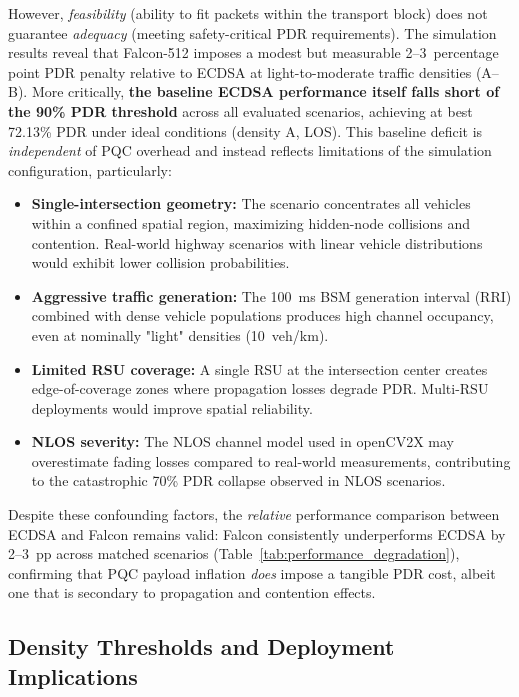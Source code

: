 \documentclass[letterpaper,journal]{IEEEtran}
\begin{document}
However, \emph{feasibility} (ability to fit packets within the transport block) does not guarantee \emph{adequacy} (meeting safety-critical PDR requirements). The simulation results reveal that Falcon-512 imposes a modest but measurable 2--3~percentage point PDR penalty relative to ECDSA at light-to-moderate traffic densities (A--B). More critically, \textbf{the baseline ECDSA performance itself falls short of the 90\% PDR threshold} across all evaluated scenarios, achieving at best 72.13\% PDR under ideal conditions (density A, LOS). This baseline deficit is \emph{independent} of PQC overhead and instead reflects limitations of the simulation configuration, particularly:

\begin{itemize}
    \item \textbf{Single-intersection geometry:} The scenario concentrates all vehicles within a confined spatial region, maximizing hidden-node collisions and contention. Real-world highway scenarios with linear vehicle distributions would exhibit lower collision probabilities.
    \item \textbf{Aggressive traffic generation:} The 100~ms BSM generation interval (RRI) combined with dense vehicle populations produces high channel occupancy, even at nominally "light" densities (10~veh/km).
    \item \textbf{Limited RSU coverage:} A single RSU at the intersection center creates edge-of-coverage zones where propagation losses degrade PDR. Multi-RSU deployments would improve spatial reliability.
    \item \textbf{NLOS severity:} The NLOS channel model used in openCV2X may overestimate fading losses compared to real-world measurements, contributing to the catastrophic 70\% PDR collapse observed in NLOS scenarios.
\end{itemize}

Despite these confounding factors, the \emph{relative} performance comparison between ECDSA and Falcon remains valid: Falcon consistently underperforms ECDSA by 2--3~pp across matched scenarios (Table~\ref{tab:performance_degradation}), confirming that PQC payload inflation \emph{does} impose a tangible PDR cost, albeit one that is secondary to propagation and contention effects.

\subsection{Density Thresholds and Deployment Implications}
\end{document}

